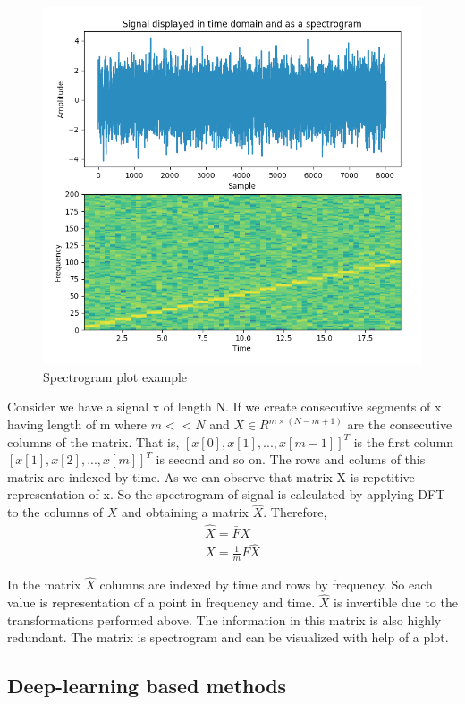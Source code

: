     \begin{figure}[h]
      	\centering
      	\includegraphics[width=0.5\linewidth]{images/spectrogram.png}
      	\caption{Spectrogram plot example \cite{spectrogram}}
      	\label{l3}
      \end{figure}
    Consider we have a signal x of length N. If we create consecutive segments of x having length of m where $m<<N $ and $X \in R^{m \times(N-m+1)}$ are the  consecutive columns of the matrix. That is, $ [x[0], x[1], . . . , x[m - 1]]^T$ is the first column $[x[1], x[2], . . . , x[m]]^T$ is second and so on. The rows and colums of this matrix are indexed by time. As we can observe that matrix X is repetitive representation of x.  
     So the spectrogram of signal is calculated by applying DFT to the columns of $X$  and obtaining a matrix $\hat{X}$. Therefore,
     \begin{gather}
     \hat{X} = \bar{F}X\\
     X = \frac{1}{m} F \hat{X}
     \end{gather}
    
 In the matrix  $\hat{X}$ columns are indexed by time and rows by frequency. So each value is representation of a point in frequency and time.  $\hat{X}$ is invertible due to the transformations performed above. The information in this matrix is also highly redundant. The matrix is spectrogram and can be visualized with help of a plot.

    

    \subsection{Deep-learning based methods }
